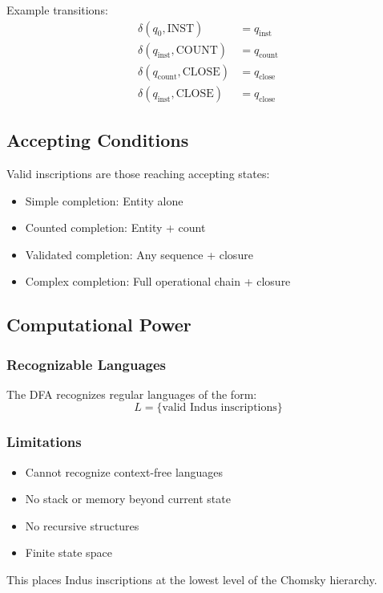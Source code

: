 Example transitions:
\begin{align*}
    \delta(q_0, \text{INST}) &= q_{\text{inst}} \\
    \delta(q_{\text{inst}}, \text{COUNT}) &= q_{\text{count}} \\
    \delta(q_{\text{count}}, \text{CLOSE}) &= q_{\text{close}} \\
    \delta(q_{\text{inst}}, \text{CLOSE}) &= q_{\text{close}}
\end{align*}

\subsection{Accepting Conditions}

Valid inscriptions are those reaching accepting states:
\begin{itemize}
    \item Simple completion: Entity alone
    \item Counted completion: Entity + count
    \item Validated completion: Any sequence + closure
    \item Complex completion: Full operational chain + closure
\end{itemize}

\subsection{Computational Power}

\subsubsection{Recognizable Languages}
The DFA recognizes regular languages of the form:
\[
L = \{\text{valid Indus inscriptions}\}
\]

\subsubsection{Limitations}
\begin{itemize}
    \item Cannot recognize context-free languages
    \item No stack or memory beyond current state
    \item No recursive structures
    \item Finite state space
\end{itemize}

This places Indus inscriptions at the lowest level of the Chomsky hierarchy.

